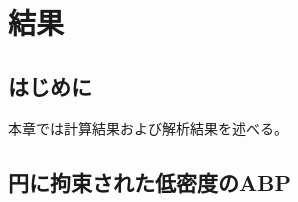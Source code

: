 \documentclass[/Users/ikedahajime/GitHub/reserch/master_report/thesis]{subfiles}
\begin{document}
\chapter{結果}
\section{はじめに}
本章では計算結果および解析結果を述べる。%

\section{円に拘束された低密度のABP}
\end{document}

